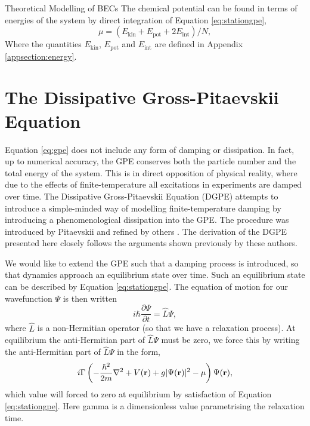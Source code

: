 \begin{chapter}{\label{cha:theoretical_model}Theoretical Modelling of BECs}
The chemical potential can be found in terms of energies of the system by direct integration of Equation \ref{eq:stationgpe},
	\begin{equation}\label{eq:chempot}
		\mu = \left ( E_{\mathrm{kin}} + E_{\mathrm{pot}} + 2E_{\mathrm{int}} \right ) / N,
	\end{equation}
	Where the quantities $E_{\mathrm{kin}}$, $E_{\mathrm{pot}}$ and $E_{\mathrm{int}}$ are defined in Appendix \ref{appsection:energy}.


\section{\label{section:dgpe} The Dissipative Gross-Pitaevskii Equation}

	Equation \ref{eq:gpe} does not include any form of damping or dissipation. In fact, up to numerical accuracy, the GPE conserves both the particle number and the total energy of the system. This is in direct opposition of physical reality, where due to the effects of finite-temperature all excitations in experiments are damped over time. The Dissipative Gross-Pitaevskii Equation (DGPE) attempts to introduce a simple-minded way of modelling finite-temperature damping by introducing a phenomenological dissipation into the GPE. The procedure was introduced by Pitaevskii \cite{lifshitzpitaevskii81} and refined by others \cite{choi_morgan_98,tsubota_kasamatsu_02,madarassy_barenghi_08}. The derivation of the DGPE presented here closely follows the arguments shown previously by these authors.

	We would like to extend the GPE such that a damping process is introduced, so that dynamics approach an equilibrium state over time. Such an equilibrium state can be described by Equation \ref{eq:stationgpe}. The equation of motion for our wavefunction $\Psi$ is then written 
		\begin{equation}\label{eq:disseqmotion}
		i\hbar \frac{\partial \Psi}{\partial t} = \hat{L}\Psi,
		\end{equation}
	where $\hat{L}$ is a non-Hermitian operator (so that we have a relaxation process). At equilibrium the anti-Hermitian part of $\hat{L}\Psi$ must be zero, we force this by writing the anti-Hermitian part of $\hat{L}\Psi$ in the form,
	\begin{equation*}\label{eq:dissantiherm}
		i\Gamma\left( -\frac{\hbar^2}{2m}\nabla^2 + V({\bf r}) + g|\Psi({\bf r})|^2 - \mu \right) \Psi({\bf r}),
	\end{equation*}
	which value will forced to zero at equilibrium by satisfaction of Equation \ref{eq:stationgpe}. Here gamma is a dimensionless value parametrising the relaxation time.


\end{chapter}
